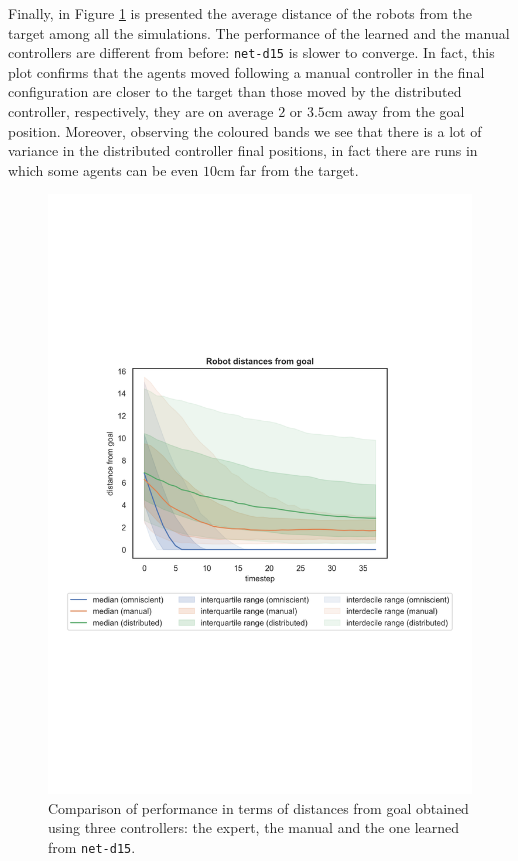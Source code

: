 \bigskip
Finally, in Figure \ref{fig:net-d15distance} is presented the average distance of 
the robots from the target among all the simulations. The performance of the 
learned and the manual controllers are different from before: \texttt{net-d15} is 
slower to converge. In fact, this plot 
confirms that the agents moved following a manual controller in the final 
configuration are closer to the target than those moved by the distributed 
controller, respectively, they are on average $2$ or $3.5$cm away from the 
goal position. Moreover, observing the coloured bands we see that there is a lot of 
variance in the distributed controller final positions, in fact there are runs in which 
some agents can be even $10$cm far from the target.
\begin{figure}[!htb]
	\centering
	\includegraphics[width=.65\textwidth]{contents/images/net-d15/distances-from-goal-compressed-distributed}%
	\caption[Evaluation of \texttt{net-d15} distances from goal.]{Comparison 
	of performance in terms of distances from goal obtained using three 
	controllers: the expert, the manual and the one learned from \texttt{net-d15}.}
	\label{fig:net-d15distance}
\end{figure}

